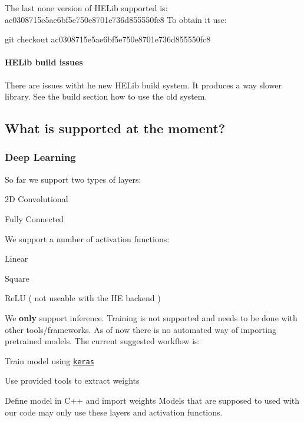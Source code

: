 The last none version of H\+E\+Lib supported is\+: {\ttfamily ac0308715e5ae6bf5e750e8701e736d855550fc8} To obtain it use\+:


\begin{DoxyCode}
git checkout ac0308715e5ae6bf5e750e8701e736d855550fc8
\end{DoxyCode}
 \paragraph*{H\+E\+Lib build issues}

There are issues witht he new H\+E\+Lib build system. It produces a way slower library. See the build section how to use the old system.

\subsection*{What is supported at the moment?}

\subsubsection*{Deep Learning}

So far we support two types of layers\+:


\begin{DoxyItemize}
\item 2D Convolutional
\item Fully Connected
\end{DoxyItemize}

We support a number of activation functions\+:
\begin{DoxyItemize}
\item Linear
\item Square
\item Re\+LU ( not useable with the HE backend )
\end{DoxyItemize}

We {\bfseries only} support inference. Training is not supported and needs to be done with other tools/frameworks. As of now there is no automated way of importing pretrained models. The current suggested workflow is\+:
\begin{DoxyEnumerate}
\item Train model using \href{https://keras.io/}{\tt keras}
\item Use provided tools to extract weights
\item Define model in C++ and import weights Models that are supposed to used with our code may only use these layers and activation functions.
\end{DoxyEnumerate}


